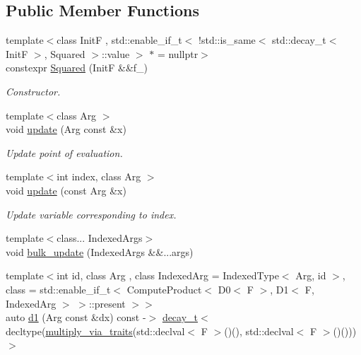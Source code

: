 \subsection*{Public Member Functions}
\begin{DoxyCompactItemize}
\item 
{\footnotesize template$<$class InitF , std\+::enable\+\_\+if\+\_\+t$<$ !std\+::is\+\_\+same$<$ std\+::decay\+\_\+t$<$ Init\+F $>$, Squared $>$\+::value $>$ $\ast$  = nullptr$>$ }\\constexpr \hyperlink{structFunG_1_1MathematicalOperations_1_1Squared_a025b768a43feca27fa1c2d23cba4281e}{Squared} (InitF \&\&f\+\_\+)
\begin{DoxyCompactList}\small\item\em Constructor. \end{DoxyCompactList}\item 
{\footnotesize template$<$class Arg $>$ }\\void \hyperlink{structFunG_1_1MathematicalOperations_1_1Squared_abea95d90dc29ac105c43f4eadde84cab}{update} (Arg const \&x)
\begin{DoxyCompactList}\small\item\em Update point of evaluation. \end{DoxyCompactList}\item 
{\footnotesize template$<$int index, class Arg $>$ }\\void \hyperlink{structFunG_1_1MathematicalOperations_1_1Squared_a1d890825175df9b79fd73bf8248496ad}{update} (const Arg \&x)
\begin{DoxyCompactList}\small\item\em Update variable corresponding to index. \end{DoxyCompactList}\item 
{\footnotesize template$<$class... Indexed\+Args$>$ }\\void \hyperlink{structFunG_1_1MathematicalOperations_1_1Squared_aa4364705dd7c5e4005da51de3d9a8d76}{bulk\+\_\+update} (Indexed\+Args \&\&...args)
\item 
{\footnotesize template$<$int id, class Arg , class Indexed\+Arg  = Indexed\+Type$<$ Arg, id $>$, class  = std\+::enable\+\_\+if\+\_\+t$<$                           Compute\+Product$<$ D0$<$ F $>$, D1$<$ F, Indexed\+Arg $>$ $>$\+::present $>$$>$ }\\auto \hyperlink{structFunG_1_1MathematicalOperations_1_1Squared_a0aa5fe8ab967ba201af104c430cf466a}{d1} (Arg const \&dx) const -\/$>$ \hyperlink{namespaceFunG_a7ff91644f18a190ac3d4fc9e970ebe2e}{decay\+\_\+t}$<$ decltype(\hyperlink{namespaceFunG_a839a72c59a888ed89d3efe38897cc376}{multiply\+\_\+via\+\_\+traits}(std\+::declval$<$ F $>$()(), std\+::declval$<$ F $>$()())) $>$

\end{DoxyCompactItemize}
